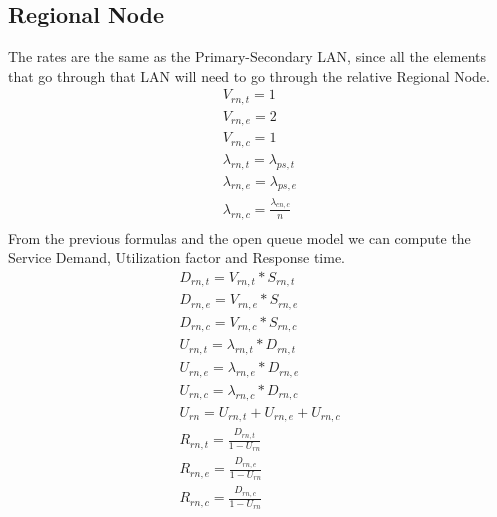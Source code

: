 \documentclass[11pt]{article}
\begin{document}
\subsection{Regional Node}
The rates are the same as the Primary-Secondary LAN, since all the elements that go through that LAN will need to go through the relative Regional Node.\\
\begin{equation}
	\begin{array}{l}
		V_{rn, t} = 1 \\
		V_{rn, e} = 2 \\ %
		V_{rn,c} = 1 \\
		\lambda_{rn, t} = \lambda_{ps, t} \\
		\lambda_{rn, e} = \lambda_{ps, e} \\
		\lambda_{rn, c} = \frac{\lambda_{cn, c}}{n} \\
	\end{array}
\end{equation}
From the previous formulas and the open queue model we can compute the Service Demand, Utilization factor and Response time.
\begin{equation}
	\begin{array}{l}
		D_{rn, t} = V_{rn, t} * S_{rn, t} \\
		D_{rn, e} = V_{rn, e} * S_{rn, e} \\
		D_{rn, c} = V_{rn, c} * S_{rn, c} \\
		U_{rn, t} = \lambda_{rn, t} * D_{rn, t} \\
		U_{rn, e} = \lambda_{rn, e} * D_{rn, e} \\
		U_{rn, c} = \lambda_{rn, c} * D_{rn, c} \\
		U_{rn} = U_{rn, t} + U_{rn, e} + U_{rn, c} \\
		R_{rn, t} = \frac{D_{rn, t}}{1 - U_{rn}} \\
		R_{rn, e} = \frac{D_{rn, e}}{1 - U_{rn}} \\
		R_{rn, c} = \frac{D_{rn, c}}{1 - U_{rn}} \\
	\end{array}
\end{equation}
\end{document}
